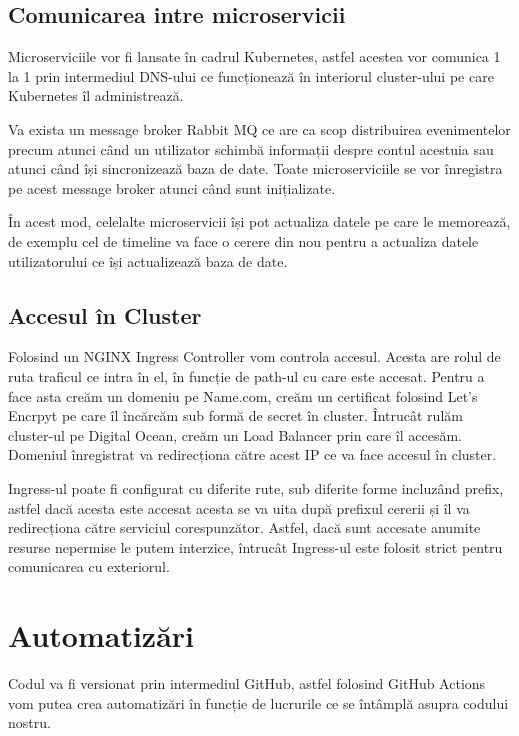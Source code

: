 \subsection{Comunicarea intre microservicii}

Microserviciile vor fi lansate în cadrul Kubernetes, astfel acestea vor comunica 1 la 1 prin intermediul
DNS-ului ce funcționează în interiorul cluster-ului pe care Kubernetes îl administrează.

Va exista un message broker Rabbit MQ ce are ca scop distribuirea evenimentelor precum atunci când
un utilizator schimbă informații despre contul acestuia sau atunci când își sincronizează baza de date.
Toate microserviciile se vor înregistra pe acest message broker atunci când sunt inițializate.

În acest mod, celelalte microservicii își pot actualiza datele pe care le memorează,
de exemplu cel de timeline va face o cerere din nou pentru a actualiza datele utilizatorului ce își actualizează baza de date.

\subsection{Accesul în Cluster}

Folosind un NGINX Ingress Controller vom controla accesul. Acesta are rolul de ruta traficul ce intra în el,
în funcție de path-ul cu care este accesat. Pentru a face asta creăm un domeniu pe Name.com, creăm un certificat
folosind Let's Encrpyt pe care îl încărcăm sub formă de secret în cluster. Întrucât rulăm cluster-ul pe Digital Ocean,
creăm un Load Balancer prin care îl accesăm. Domeniul înregistrat va redirecționa către acest IP ce va face accesul în cluster.

Ingress-ul poate fi configurat cu diferite rute, sub diferite forme incluzând prefix, astfel
dacă acesta este accesat acesta se va uita după prefixul cererii și îl va redirecționa către serviciul corespunzător.
Astfel, dacă sunt accesate anumite resurse nepermise le putem interzice, întrucât Ingress-ul este folosit strict pentru comunicarea cu
exteriorul.

\section{Automatizări}

Codul va fi versionat prin intermediul GitHub, astfel folosind GitHub Actions vom putea crea
automatizări în funcție de lucrurile ce se întâmplă asupra codului nostru.

